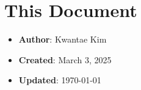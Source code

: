 \documentclass[a4paper,12pt]{article}
\begin{document}
\section{This Document}

\begin{itemize}
    \item \textbf{Author}: Kwantae Kim
    \item \textbf{Created}: March 3, 2025
    \item \textbf{Updated}: \today
\end{itemize}


\label{lastpage}
\end{document}
